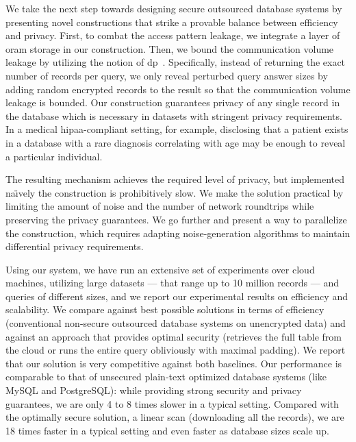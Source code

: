 	We take the next step towards designing secure outsourced database systems by presenting novel constructions that strike a provable balance between efficiency and privacy.
	First, to combat the access pattern leakage, we integrate a layer of \acrshort{oram} storage in our construction.
	Then, we bound the communication volume leakage by utilizing the notion of \acrfull{dp}~\cite{differential-privacy-original}.
	Specifically, instead of returning the exact number of records per query, we only reveal perturbed query answer sizes by adding random encrypted records to the result so that the communication volume leakage is bounded.
	Our construction guarantees privacy of any single record in the database which is necessary in datasets with stringent privacy requirements.
	In a medical \acrshort{hipaa}-compliant setting, for example, disclosing that a patient exists in a database with a rare diagnosis correlating with age may be enough to reveal a particular individual.

	The resulting mechanism achieves the required level of privacy, but implemented na\"{\i}vely the construction is prohibitively slow.
	We make the solution practical by limiting the amount of noise and the number of network roundtrips while preserving the privacy guarantees.
	We go further and present a way to parallelize the construction, which requires adapting noise-generation algorithms to maintain differential privacy requirements.

	Using our system, we have run an extensive set of experiments over cloud machines, utilizing large datasets --- that range up to 10 million records --- and queries of different sizes, and we report our experimental results on efficiency and scalability.
	We compare against best possible solutions in terms of efficiency (conventional non-secure outsourced database systems on unencrypted data) and against an approach that provides optimal security (retrieves the full table from the cloud or runs the entire query obliviously with maximal padding).
	We report that our solution is very competitive against both baselines.
	Our performance is comparable to that of unsecured plain-text optimized database systems (like MySQL and PostgreSQL): while providing strong security and privacy guarantees, we are only 4 to 8 times slower in a typical setting.
	Compared with the optimally secure solution, a linear scan (downloading all the records), we are 18 times faster in a typical setting and even faster as database sizes scale up.

	\smallskip


